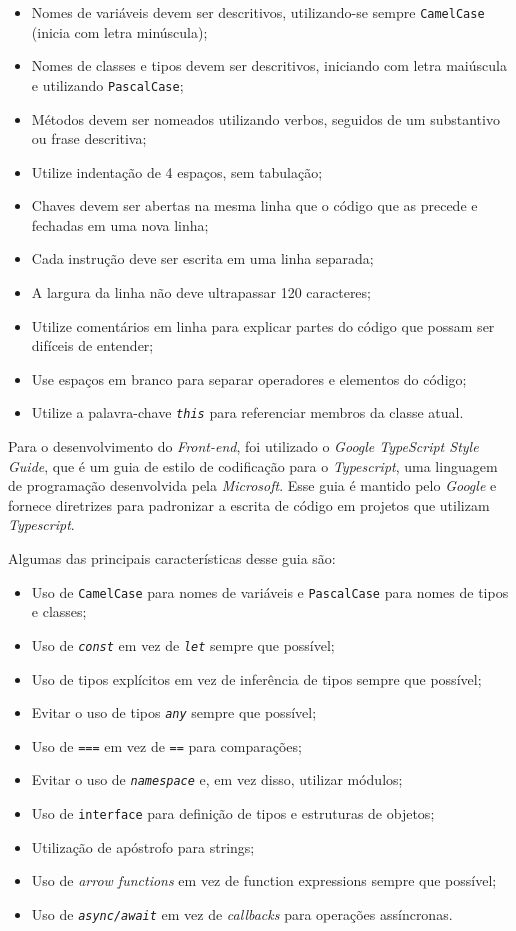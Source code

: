 \begin{itemize}
\item Nomes de variáveis devem ser descritivos, utilizando-se sempre \texttt{\gls{CamelCase}} (inicia com letra minúscula);
\item Nomes de classes e tipos devem ser descritivos, iniciando com letra maiúscula e utilizando \texttt{\gls{PascalCase}};
\item Métodos devem ser nomeados utilizando verbos, seguidos de um substantivo ou frase descritiva;
\item Utilize indentação de 4 espaços, sem tabulação;
\item Chaves devem ser abertas na mesma linha que o código que as precede e fechadas em uma nova linha;
\item Cada instrução deve ser escrita em uma linha separada;
\item A largura da linha não deve ultrapassar 120 caracteres;
\item Utilize comentários em linha para explicar partes do código que possam ser difíceis de entender;
\item Use espaços em branco para separar operadores e elementos do código;
\item Utilize a palavra-chave \textit{\texttt{this}} para referenciar membros da classe atual.
\end{itemize}

Para o desenvolvimento do \textit{\gls{Front-end}}, foi utilizado o \textit{Google TypeScript Style Guide}, que é um guia de estilo de codificação para o \textit{\gls{Typescript}}, uma linguagem de programação desenvolvida pela \textit{\gls{Microsoft}}. Esse guia é mantido pelo \textit{Google} e fornece diretrizes para padronizar a escrita de código em projetos que utilizam \textit{\gls{Typescript}}.

Algumas das principais características desse guia são:

\begin{itemize}
\item Uso de \texttt{\gls{CamelCase}} para nomes de variáveis e \texttt{\gls{PascalCase}} para nomes de tipos e classes;
\item Uso de \textit{\texttt{const}} em vez de \textit{\texttt{let}} sempre que possível;
\item Uso de tipos explícitos em vez de inferência de tipos sempre que possível;
\item Evitar o uso de tipos \textit{\texttt{any}} sempre que possível;
\item Uso de \texttt{===} em vez de \texttt{==} para comparações;
\item Evitar o uso de \textit{\texttt{namespace}} e, em vez disso, utilizar módulos;
\item Uso de \texttt{interface} para definição de tipos e estruturas de objetos;
\item Utilização de apóstrofo para strings;
\item Uso de \textit{arrow functions} em vez de function expressions sempre que possível;
\item Uso de \textit{\texttt{async/await}} em vez de \textit{callbacks} para operações assíncronas.
\end{itemize}

